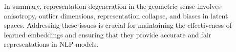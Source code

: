 In summary, representation degeneration in the geometric sense involves anisotropy, outlier dimensions, representation collapse, and biases in latent spaces. Addressing these issues is crucial for maintaining the effectiveness of learned embeddings and ensuring that they provide accurate and fair representations in NLP models.
